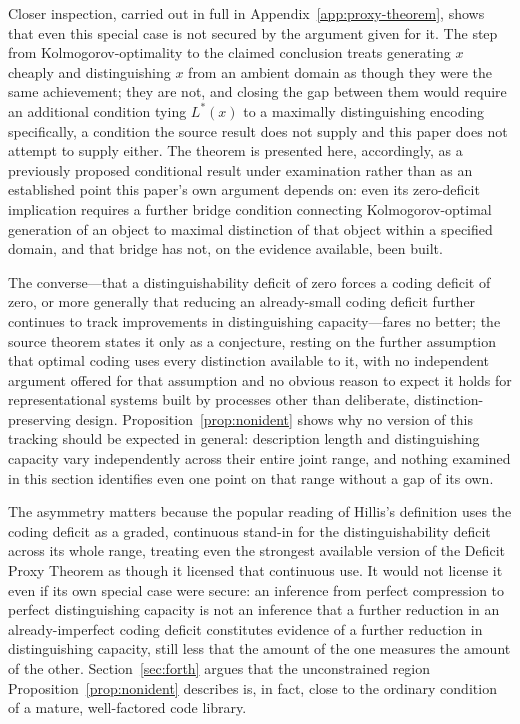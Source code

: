 \documentclass[11pt]{article}
\theoremstyle{plain}
\begin{document}
Closer inspection, carried out in full in Appendix~\ref{app:proxy-theorem}, shows that even this special case is not secured by the argument given for it. The step from Kolmogorov-optimality to the claimed conclusion treats generating $x$ cheaply and distinguishing $x$ from an ambient domain as though they were the same achievement; they are not, and closing the gap between them would require an additional condition tying $L^*(x)$ to a maximally distinguishing encoding specifically, a condition the source result does not supply and this paper does not attempt to supply either. The theorem is presented here, accordingly, as a previously proposed conditional result under examination rather than as an established point this paper's own argument depends on: even its zero-deficit implication requires a further bridge condition connecting Kolmogorov-optimal generation of an object to maximal distinction of that object within a specified domain, and that bridge has not, on the evidence available, been built.

The converse---that a distinguishability deficit of zero forces a coding deficit of zero, or more generally that reducing an already-small coding deficit further continues to track improvements in distinguishing capacity---fares no better; the source theorem states it only as a conjecture, resting on the further assumption that optimal coding uses every distinction available to it, with no independent argument offered for that assumption and no obvious reason to expect it holds for representational systems built by processes other than deliberate, distinction-preserving design. Proposition~\ref{prop:nonident} shows why no version of this tracking should be expected in general: description length and distinguishing capacity vary independently across their entire joint range, and nothing examined in this section identifies even one point on that range without a gap of its own.

The asymmetry matters because the popular reading of Hillis's definition uses the coding deficit as a graded, continuous stand-in for the distinguishability deficit across its whole range, treating even the strongest available version of the Deficit Proxy Theorem as though it licensed that continuous use. It would not license it even if its own special case were secure: an inference from perfect compression to perfect distinguishing capacity is not an inference that a further reduction in an already-imperfect coding deficit constitutes evidence of a further reduction in distinguishing capacity, still less that the amount of the one measures the amount of the other. Section~\ref{sec:forth} argues that the unconstrained region Proposition~\ref{prop:nonident} describes is, in fact, close to the ordinary condition of a mature, well-factored code library.
\end{document}
